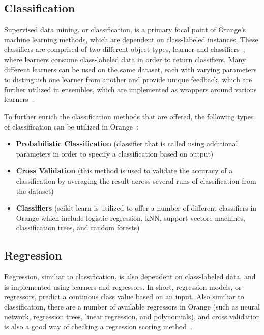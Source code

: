 \subsection{Classification}
Supervised data mining, or classification, is a primary focal point of
Orange's machine learning methods, which are dependent on class-labeled
instances. These classifiers are comprised of two different object types,
learner and classifiers~\cite{hid-sp18-504-orange}; where learners consume
class-labeled data in order to return classifiers. Many different learners
can be used on the same dataset, each with varying
parameters to distinguish
one learner from another and provide unique feedback, which are further
utilized in ensembles, which are implemented as wrappers around various
learners~\cite{hid-sp18-504-predanalytics}.

To further enrich the classification methods that are offered, the following
types of classification can be utilized in Orange~\cite{hid-sp18-504-orange}:

\begin{itemize}

   \item {\bf Probabilistic Classification} (classifier that is called using
   additional parameters in order to specify a classification based on output)
   \item {\bf Cross Validation} (this method is used to validate the accuracy
   of a classification by averaging the result across several runs of
   classification from the dataset)
   \item {\bf Classifiers} (scikit-learn is utilized to offer a number of
   different classifiers in Orange which include logistic regression, kNN,
   support vectore machines, classification trees, and random forests)

\end{itemize}

\subsection{Regression}
Regression, similiar to classification, is also dependent on class-labeled
data, and is implemented using learners and regressors. In short, regression
models, or regressors, predict a continous class value based on an input.
Also similiar to classification, there are a number of available regressors
in Orange (such as neural network, regression trees, linear regression, and
polynomials), and cross validation is also a good way of checking a regression
scoring method~\cite{hid-sp18-504-orange}.

